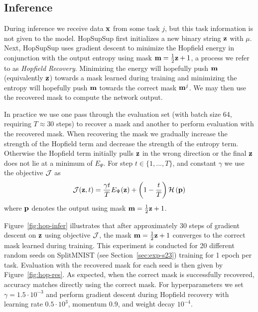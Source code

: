 \documentclass{article}
\newcommand{\ac}{SupSup\xspace}
\begin{document}
\subsection{Inference}
During inference we receive data $\mathbf{x}$ from some task $j$, but this task information is not given to the model. Hop\ac first initializes a new binary string $\mathbf{z}$ with $\mu$. Next, Hop\ac uses gradient descent to minimize the Hopfield energy in conjunction with the output entropy using mask $\mathbf{m} = \frac{1}{2}\mathbf{z} + 1$, a process we refer to as \emph{Hopfield Recovery}. Minimizing the energy will hopefully push $\mathbf{m}$ (equivalently $\mathbf{z}$) towards a mask learned during training and minimizing the entropy will hopefully push $\mathbf{m}$ towards the correct mask $\mathbf{m}^j$. We may then use the recovered mask to compute the network output.

In practice we use one pass through the evaluation set (with batch size 64, requiring $T \approx 30$ steps) to recover a mask and another to perform evaluation with the recovered mask. When recovering the mask we gradually increase the strength of the Hopfield term and decrease the strength of the entropy term. Otherwise the Hopfield term initially pulls $\mathbf{z}$ in the wrong direction or the final $\mathbf{z}$ does not lie at a minimum of $E_\Psi$. For step $t \in \{1,...,T\}$, and constant $\gamma$ we use the objective $\mathcal{J}$ as
\begin{align}
    \mathcal{J}(\mathbf{z}, t) = \frac{\gamma t}{T} E_{\Psi}(\mathbf{z}) +  \left( 1 - \frac{t}{T} \right)  \mathcal{H}\left( \mathbf{p} \right)
\end{align}
where $\mathbf{p}$ denotes the output using mask $\mathbf{m} = \frac{1}{2}\mathbf{z} + 1$. 

Figure~\ref{fig:hop-infer} illustrates that after approximately 30 steps of gradient descent on $\mathbf{z}$ using objective $\mathcal{J}$, the mask $\mathbf{m} = \frac{1}{2}\mathbf{z} + 1$ converges to the correct mask learned during training. This experiment is conducted for 20 different random seeds on SplitMNIST (see Section~\ref{sec:exp-s23}) training for 1 epoch per task. Evaluation with the recovered mask for each seed is then given by Figure~\ref{fig:hop-res}. As expected, when the correct mask is successfully recovered, accuracy matches directly using the correct mask. For hyperparameters we set $\gamma = 1.5 \cdot 10^{-3}$ and perform gradient descent during Hopfield recovery with learning rate $0.5 \cdot 10^3$, momentum $0.9$, and weight decay $10^{-4}$. 
\end{document}
